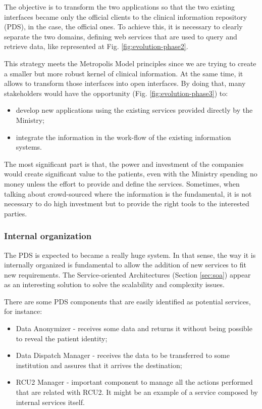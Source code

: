 The objective is to transform the two applications so that the two existing interfaces became only the official clients to the clinical information repository (PDS), in the case, the official ones. To achieve this, it is necessary to clearly separate the two domains, defining web services that are used to query and retrieve data, like represented at Fig. \ref{fig:evolution-phase2}.


This strategy meets the Metropolis Model principles since we are trying to create a smaller but more robust kernel of clinical information. At the same time, it allows to transform those interfaces into open interfaces. By doing that, many stakeholders would have the opportunity (Fig. \ref{fig:evolution-phase3}) to: 
\begin{itemize}
\item develop new applications using the existing services provided directly by the Ministry;
\item integrate the information in the work-flow of the existing information systems.
\end{itemize}

The most significant part is that, the power and investment of the companies would create significant value to the patients, even with the Ministry spending no money unless the effort to provide and define the services. Sometimes, when talking about crowd-sourced where the information is the fundamental, it is not necessary to do high investment but to provide the right tools to the interested parties.


\subsubsection{Internal organization}

The PDS is expected to became a really huge system. In that sense, the way it is internally organized is fundamental to allow the addition of new services to fit new requirements. The Service-oriented Architectures (Section \ref{sec:soa}) appear as an interesting solution to solve the scalability and complexity issues.

There are some PDS components that are easily identified as potential services, for instance:
\begin{itemize}
\item Data Anonymizer - receives some data and returns it without being possible to reveal the patient identity;
\item Data Dispatch Manager - receives the data to be transferred to some institution and assures that it arrives the destination;
\item RCU2 Manager - important component to manage all the actions performed that are related with RCU2. It might be an example of a service composed by internal services itself.
\end{itemize}

